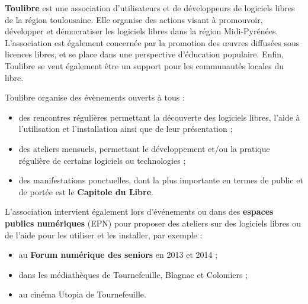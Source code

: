 
\textbf{Toulibre} est une association d'utilisateurs et de développeurs de logiciels libres de la région toulousaine. Elle organise des actions visant à promouvoir, développer et démocratiser les logiciels libres dans la région Midi-Pyrénées. L'association est également concernée par la promotion des œuvres diffusées sous licences libres, et se place dans une perspective d'éducation populaire. Enfin, Toulibre se veut également être un support pour les communautés locales du libre.

\Separateur

Toulibre organise des évènements ouverts à tous :
\begin{itemize}[label=$\bullet$]
\item des rencontres régulières permettant la découverte des logiciels libres, l'aide à l'utilisation et l'installation ainsi que de leur présentation ;
\item des ateliers mensuels, permettant le développement et/ou la 
pratique régulière de certains logiciels ou technologies ;
\item des manifestations ponctuelles, dont la plus importante en termes 
de public et de portée est le \textbf{Capitole du Libre}.
\end{itemize}

L'association intervient également lors d'événements ou dans des \textbf{espaces publics numériques} (EPN) pour proposer des ateliers sur des logiciels libres ou de l'aide pour les utiliser et les installer, par exemple :
\begin{itemize}[label=$\bullet$]
\item au \textbf{Forum numérique des seniors} en 2013 et 2014 ;
\item dans les médiathèques de Tournefeuille, Blagnac et Colomiers ;
\item au cinéma Utopia de Tournefeuille.
\end{itemize}
